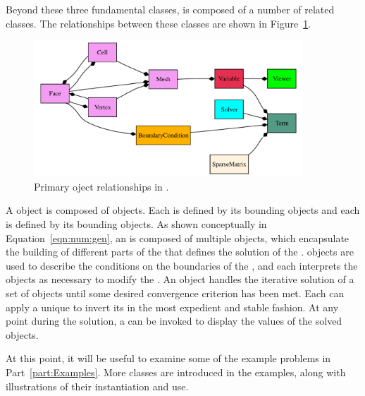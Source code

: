 Beyond these three fundamental classes, \FiPy{} is composed of a
number of related classes. The relationships between these classes are shown in
Figure~\ref{fig:objects}. 
\begin{figure}[tbp]
    \centering
    \includegraphics[width=0.9\textwidth]{objects}
    \caption{Primary oject relationships in \FiPy{}.}
    \label{fig:objects}
\end{figure}
A  object is composed of  objects.  Each
 is defined by its bounding  objects and each
 is defined by its bounding  objects.  As
shown conceptually in Equation~\eqref{eqn:num:gen}, an
 is composed of multiple  objects, which
encapsulate the building of different parts of the
 that defines the solution of the
.   objects are used to
describe the conditions on the boundaries of the , and
each  interprets the  objects as
necessary to modify the .  An 
object handles the iterative solution of a set of 
objects until some desired convergence criterion has been met.  Each
 can apply a unique  to invert its
 in the most expedient and stable fashion.  At any
point during the solution, a  can be invoked to display
the values of the solved  objects.

At this point, it will be useful to examine some of the example
problems in Part~\ref{part:Examples}.  More classes are introduced in
the examples, along with illustrations of their instantiation and use.


